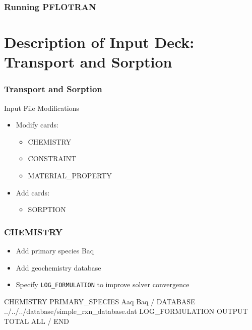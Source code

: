 \documentclass{beamer}
\newcommand\magentacomment[1]{{{\color{magenta} #1}}}
\begin{document}
\begin{frame}[fragile]\frametitle{Running PFLOTRAN}


\end{frame}

\section{Description of Input Deck: Transport and Sorption}

\begin{frame}[fragile]\frametitle{Transport and Sorption}

Input File Modifications
\begin{itemize}
\item Modify cards:
  \begin{itemize}
    \item CHEMISTRY
    \item CONSTRAINT
    \item MATERIAL\_PROPERTY
   \end{itemize}
\item Add cards:
  \begin{itemize}
    \item SORPTION
  \end{itemize}
\end{itemize}

\end{frame}

\begin{frame}\frametitle{CHEMISTRY}

\begin{itemize}
  \item Add primary species Baq
  \item Add geochemistry database
  \item Specify \verb|LOG_FORMULATION| to improve solver convergence
\end{itemize}

\begin{semiverbatim}
CHEMISTRY
  PRIMARY_SPECIES
    Aaq
    \magentacomment{Baq}
  /
  \magentacomment{DATABASE ../../../database/simple_rxn_database.dat}
  \magentacomment{LOG_FORMULATION}
  OUTPUT
    TOTAL
    ALL
  /
END
\end{semiverbatim}

\end{frame}
\end{document}
